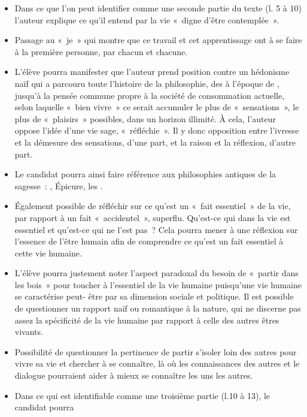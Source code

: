 {\begin{itemize}[label=\textbullet]
«~tâche~» est à réaliser de manière singulière, et qu'il n'y a peut-être pas de recette toute
faite et générale pour rendre sa vie «~digne d'être contemplée~». Il y a une tension dans
le texte entre le général et le singulier.
\item Dans ce que l'on peut identifier comme une seconde partie du texte (l. 5 à 10) l'auteur
explique ce qu'il entend par la vie «~digne d'être contemplée~».
\item Passage au «~je~» qui montre que ce travail et cet apprentissage ont à se faire à la
première personne, par chacun et chacune.
\item L'élève pourra manifester que l'auteur prend position contre un hédonisme naïf qui a
parcouru toute l'histoire de la philosophie, des  à l'époque de , jusqu'à la
pensée commune propre à la société de consommation actuelle, selon laquelle «~bien
vivre~» ce serait accumuler le plus de «~sensations~», le plus de «~plaisirs~» possibles,
dans un horizon illimité. À cela, l'auteur oppose l'idée d'une vie sage, «~réfléchie~». Il y
donc opposition entre l'ivresse et la démesure des sensations, d'une part, et la raison et
la réflexion, d'autre part.
\item Le candidat pourra ainsi faire référence aux philosophies antiques de la sagesse~: ,
Épicure, les .
\item Également possible de réfléchir sur ce qu'est un «~fait essentiel~» de la vie, par rapport à
un fait «~accidentel~», superflu. Qu'est-ce qui dans la vie est essentiel et qu'est-ce qui ne
l'est pas~? Cela pourra mener à une réflexion sur l'essence de l'être humain afin de
comprendre ce qu'est un fait essentiel à cette vie humaine.
\item L'élève pourra justement noter l'aspect paradoxal du besoin de «~partir dans les bois~»
pour toucher à l'essentiel de la vie humaine puisqu'une vie humaine se caractérise peut-
être par sa dimension sociale et politique. Il est possible de questionner un rapport naïf ou romantique à la nature, qui ne discerne pas assez la spécificité de la vie humaine par
rapport à celle des autres êtres vivants.
\item Possibilité de questionner la pertinence de partir s'isoler loin des autres pour vivre sa vie
et chercher à se connaître, là où les connaissances des autres et le dialogue pourraient
aider à mieux se connaître les uns les autres.
\item Dans ce qui est identifiable comme une troisième partie (l.10 à 13), le candidat pourra

\end{itemize}}
